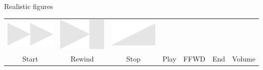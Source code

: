 \documentclass[14pt]{beamer}
\begin{document}
\begin{frame}{Realistic figures}
\begin{center}
{\begin{tabular}{ccccccc}
                \includegraphics[scale=0.1]{figures/figure026k.pdf} &
                \includegraphics[scale=0.1]{figures/figure026n.pdf} &
                \includegraphics[scale=0.1]{figures/figure026l.pdf}\\
                Start & Rewind & Stop & Play & FFWD & End & Volume \\
            \end{tabular}}
        \end{center}
    \end{frame}

\end{document}
